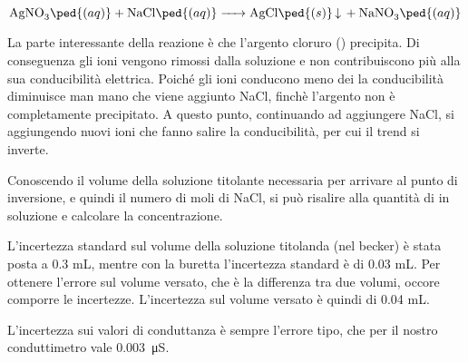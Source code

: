 \begin{equation*}
        \ce{AgNO3\ped{(aq)} + NaCl\ped{(aq)} -> AgCl\ped{(s)} v + NaNO3\ped{(aq)}}
\end{equation*}

La parte interessante della reazione è che l'argento cloruro () precipita. Di conseguenza gli ioni 
vengono rimossi dalla soluzione e non contribuiscono più alla sua conducibilità elettrica.
Poiché gli ioni  conducono meno dei  la conducibilità diminuisce man mano che viene aggiunto NaCl,
finchè l'argento non è completamente precipitato. A questo punto, continuando ad aggiungere NaCl, si aggiungendo nuovi ioni  che fanno salire la conducibilità,
per cui il trend si inverte.

Conoscendo il volume della soluzione titolante necessaria per arrivare al punto di inversione, e quindi il numero di moli
di NaCl, si può risalire alla quantità di  in soluzione e calcolare la concentrazione.

L'incertezza standard sul volume della soluzione titolanda (nel becker) è stata posta a 0.3 mL, mentre con la
buretta l'incertezza standard è di 0.03 mL. Per ottenere l'errore sul volume versato, che è la differenza tra due volumi,
occore comporre le incertezze. L'incertezza sul volume versato è quindi di 0.04 mL.

L'incertezza sui valori di conduttanza è sempre l'errore tipo, che per il nostro conduttimetro vale \SI{0.003}{\micro\siemens}.
